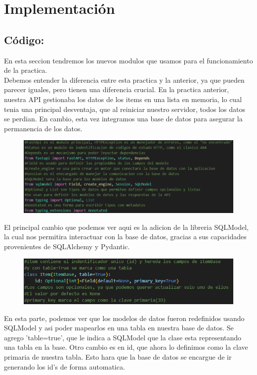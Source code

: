 \documentclass[12pt]{article}
\begin{document}
\section{Implementación}
\subsection*{Código:}
En esta seccion tendremos los nuevos modulos que usamos para el funcionamiento de la practica.\\

Debemos entender la diferencia entre esta practica y la anterior, ya que pueden parecer iguales, pero tienen una diferencia crucial. 
En la practica anterior, nuestra API gestionaba los datos de los items en una lista en memoria, lo cual tenia una principal desventaja,
que al reiniciar nuestro servidor, todos los datos se perdian. 
En cambio, esta vez integramos una base de datos para asegurar la permanencia de los datos.

\begin{figure}[H]
    \centering
    \includegraphics[width=1\textwidth]{Imagenes/Imagen WEB 3_1.png}
\end{figure}

El principal cambio que podemos ver aqui es la adicion de la libreria SQLModel, la cual nos permitira interactuar con la base de datos,
gracias a sus capacidades provenientes de SQLAlchemy y Pydantic.

\begin{figure}[h!]
    \centering
    \includegraphics[width=1\textwidth]{Imagenes/Imagen WEB 3_2.png}
\end{figure}

En esta parte, podemos ver que los modelos de datos fueron redefinidos usando SQLModel y asi poder mapearlos en una tabla en nuestra base de datos.
Se agrego 'table=true', que le indica a SQLModel que la clase esta representando una tabla en la base.
Otro cambio es en id, que ahora lo definimos como la clave primaria de nuestra tabla. Esto hara que la base de datos se encargue de ir generando los id's
de forma automatica.\\
\end{document}
